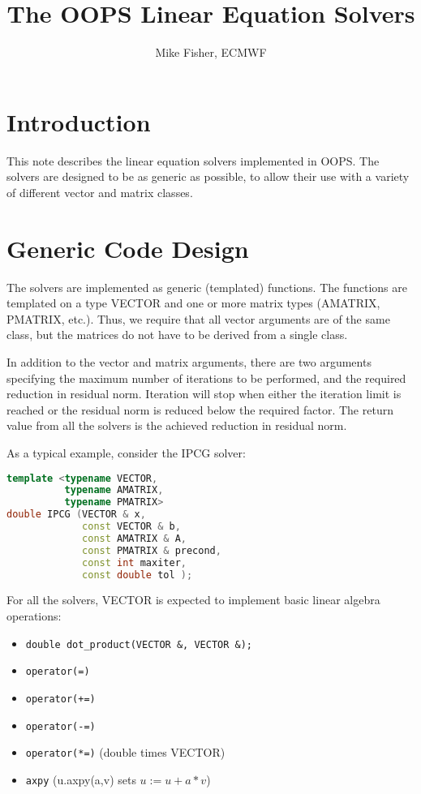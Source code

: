 \documentclass[12pt]{article}
\title{The OOPS Linear Equation Solvers}
\author{Mike Fisher, ECMWF}
\begin{document}
\maketitle

\section{Introduction}
This note describes the linear equation solvers implemented in OOPS.
The solvers are designed to be as generic as possible, to allow their
use with a variety of different vector and matrix classes.

\section{Generic Code Design}

The solvers are implemented as generic (templated) functions. The functions
are templated on a type VECTOR and one or more matrix types (AMATRIX,
PMATRIX, etc.). Thus, we require that all vector arguments are of the same
class, but the matrices do not have to be derived from a single class.

In addition to the vector and matrix arguments, there are two arguments
specifying the maximum number of iterations to be performed, and the
required reduction in residual norm. Iteration will stop when either the
iteration limit is reached or the residual norm is reduced below the
required factor. The return value from all the solvers is the achieved 
reduction in residual norm.

As a typical example, consider the IPCG solver:
\begin{center}
\begin{minipage}{0.8\textwidth}
\begin{lstlisting}[language=c++]
template <typename VECTOR,
          typename AMATRIX,
          typename PMATRIX>
double IPCG (VECTOR & x,
             const VECTOR & b,
             const AMATRIX & A,
             const PMATRIX & precond,
             const int maxiter,
             const double tol );
\end{lstlisting}
\end{minipage}
\end{center}

For all the solvers, VECTOR is expected to implement basic linear algebra
operations:
\begin{itemize}
\item {\tt double dot\_product(VECTOR \&, VECTOR \&);}
\item {\tt operator(=)}
\item {\tt operator(+=)}
\item {\tt operator(-=)}
\item {\tt operator(*=)} (double times VECTOR)
\item {\tt axpy} (u.axpy(a,v) sets $u := u + a*v$)
\end{itemize}
\end{document}
